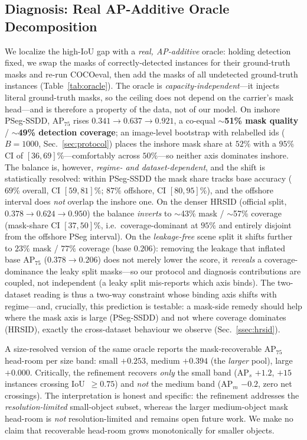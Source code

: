 \documentclass[journal]{IEEEtran}
\begin{document}
\subsection{Diagnosis: Real AP-Additive Oracle Decomposition}
\label{ssec:oracle}
We localize the high-IoU gap with a \emph{real, AP-additive} oracle: holding detection fixed, we swap the masks of correctly-detected instances for their ground-truth masks and re-run COCOeval, then add the masks of all undetected ground-truth instances (Table~\ref{tab:oracle}). The oracle is \emph{capacity-independent}---it injects literal ground-truth masks, so the ceiling does not depend on the carrier's mask head---and is therefore a property of the data, not of our model. On inshore PSeg-SSDD, AP$_{75}$ rises $0.341\!\rightarrow\!0.637\!\rightarrow\!0.921$, a co-equal $\sim$\textbf{51\% mask quality} / $\sim$\textbf{49\% detection coverage}; an image-level bootstrap with relabelled ids ($B\!=\!1000$, Sec.~\ref{sec:protocol}) places the inshore mask share at $52\%$ with a $95\%$ CI of $[36,69]\%$---comfortably across $50\%$---so neither axis dominates inshore. The balance is, however, \emph{regime- and dataset-dependent}, and the shift is statistically resolved: within PSeg-SSDD the mask share tracks base accuracy ($69\%$ overall, CI $[59,81]\%$; $87\%$ offshore, CI $[80,95]\%$), and the offshore interval does \emph{not} overlap the inshore one. On the denser HRSID (official split, $0.378\!\rightarrow\!0.624\!\rightarrow\!0.950$) the balance \emph{inverts} to $\sim$43\% mask / $\sim$57\% coverage (mask-share CI $[37,50]\%$, i.e.\ coverage-dominant at $95\%$ and entirely disjoint from the offshore PSeg interval). On the \emph{leakage-free} scene split it shifts further to $23\%$ mask / $77\%$ coverage (base $0.206$): removing the leakage that inflated base AP$_{75}$ ($0.378\!\to\!0.206$) does not merely lower the score, it \emph{reveals} a coverage-dominance the leaky split masks---so our protocol and diagnosis contributions are coupled, not independent (a leaky split mis-reports which axis binds). The two-dataset reading is thus a two-way constraint whose binding axis shifts with regime---and, crucially, this prediction is testable: a mask-side remedy should help where the mask axis is large (PSeg-SSDD) and not where coverage dominates (HRSID), exactly the cross-dataset behaviour we observe (Sec.~\ref{ssec:hrsid}).

A size-resolved version of the same oracle reports the mask-recoverable AP$_{75}$ head-room per size band: small $+0.253$, medium $+0.394$ (the \emph{larger} pool), large $+0.000$. Critically, the refinement recovers \emph{only} the small band (AP$_{s}$ $+1.2$, $+15$ instances crossing IoU~$\ge0.75$) and \emph{not} the medium band (AP$_{m}$ $-0.2$, zero net crossings). The interpretation is honest and specific: the refinement addresses the \emph{resolution-limited} small-object subset, whereas the larger medium-object mask head-room is \emph{not} resolution-limited and remains open future work. We make no claim that recoverable head-room grows monotonically for smaller objects.
\end{document}
